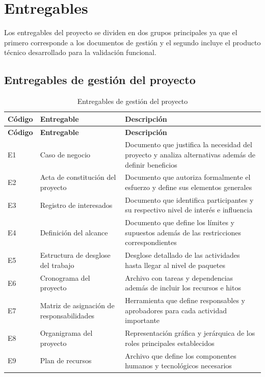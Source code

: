\documentclass[11pt,spanish]{article}
\begin{document}
\section{Entregables}

Los entregables del proyecto se dividen en dos grupos principales ya que el primero corresponde a los documentos de gestión y el segundo incluye el producto técnico desarrollado para la validación funcional.

\subsection{Entregables de gestión del proyecto}

\begin{longtable}{L{1.5cm} L{5.8cm} L{7.1cm}}
\caption{Entregables de gestión del proyecto}\label{tab:entregables-gestion}\\[-0.5em]
\toprule
\textbf{Código} & \textbf{Entregable} & \textbf{Descripción} \\
\midrule
\endfirsthead
\toprule
\textbf{Código} & \textbf{Entregable} & \textbf{Descripción} \\
\midrule
\endhead
E1 & Caso de negocio & Documento que justifica la necesidad del proyecto y analiza alternativas además de definir beneficios \\
E2 & Acta de constitución del proyecto & Documento que autoriza formalmente el esfuerzo y define sus elementos generales \\
E3 & Registro de interesados & Documento que identifica participantes y su respectivo nivel de interés e influencia \\
E4 & Definición del alcance & Documento que define los límites y supuestos además de las restricciones correspondientes \\
E5 & Estructura de desglose del trabajo & Desglose detallado de las actividades hasta llegar al nivel de paquetes \\
E6 & Cronograma del proyecto & Archivo con tareas y dependencias además de incluir los recursos e hitos \\
E7 & Matriz de asignación de responsabilidades & Herramienta que define responsables y aprobadores para cada actividad importante \\
E8 & Organigrama del proyecto & Representación gráfica y jerárquica de los roles principales establecidos \\
E9 & Plan de recursos & Archivo que define los componentes humanos y tecnológicos necesarios \\

\end{longtable}
\end{document}
